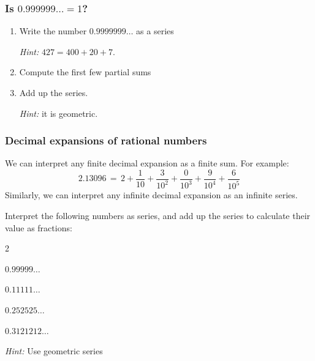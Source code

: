 \begin{frame}[t]
	\frametitle{Is $\displaystyle 0.999999\ldots = 1$?}

	\begin{enumerate}
		\item Write the number \; $\displaystyle 0.9999999\ldots$ \; as a series

			\emph{Hint:} $\displaystyle 427 = 400 + 20 + 7$.
			\vspace{.5cm}

		\item Compute the first few partial sums
			\vspace{.5cm}

		\item Add up the series.

			\emph{Hint:} it is geometric.
	\end{enumerate}
\end{frame}

\begin{frame}[t]
	\fontsize{13}{13}\selectfont
	\frametitle{Decimal expansions of rational numbers}

	We can interpret any finite decimal expansion as a finite sum. For example:
	\[
		2.13096 \, = \, 2 + \frac{1}{10}+ \frac{3}{10^{2}}+ \frac{0}{10^{3}}+ \frac{9}{10^{4}}
		+ \frac{6}{10^{5}}
	\]
	Similarly, we can interpret any infinite decimal expansion as an infinite
	series.
	\vspace{.5cm}

	Interpret the following numbers as series, and add up the series to calculate their
	value as fractions:
	\begin{enumerate}
	\end{enumerate}
	\emph{Hint:} Use geometric series
\end{frame}

